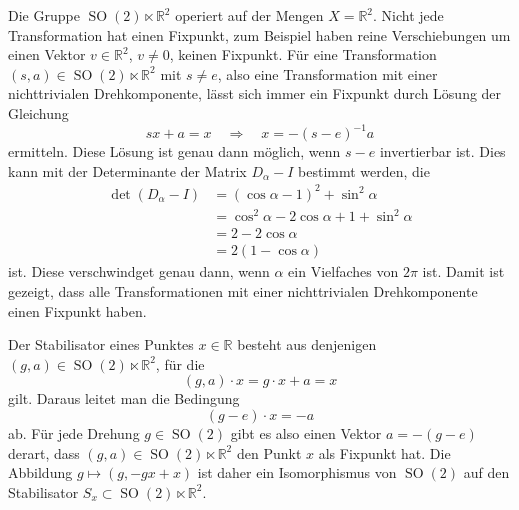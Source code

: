 \begin{beispiel}
Die Gruppe $\operatorname{SO}(2)\ltimes\mathbb{R}^2$ operiert auf der
Mengen $X=\mathbb{R}^2$.
Nicht jede Transformation hat einen Fixpunkt, zum Beispiel haben reine
Verschiebungen um einen Vektor $v\in\mathbb{R}^2$, $v\ne 0$, keinen
Fixpunkt.
Für eine Transformation $(s,a)\in\operatorname{SO}(2)\ltimes \mathbb{R}^2$
mit $s\ne e$, also eine Transformation mit einer nichttrivialen
Drehkomponente, lässt sich immer ein Fixpunkt durch Lösung der 
Gleichung
\[
sx+a=x
\quad\Rightarrow\quad
x = -(s-e)^{-1}a
\]
ermitteln.
Diese Lösung ist genau dann möglich, wenn $s-e$ invertierbar ist.
Dies kann mit der Determinante der Matrix $D_\alpha-I$ bestimmt werden,
die
\begin{align*}
\det(D_\alpha-I)
&=
(\cos\alpha-1)^2+\sin^2\alpha
\\
&=
\cos^2\alpha-2\cos\alpha +1+\sin^2\alpha
\\
&=
2-2\cos\alpha 
\\
&=
2(1-\cos\alpha)
\end{align*}
ist.
Diese verschwindget genau dann, wenn $\alpha$ ein Vielfaches von $2\pi$ ist.
Damit ist gezeigt, dass alle Transformationen mit einer nichttrivialen
Drehkomponente einen Fixpunkt haben.

Der Stabilisator eines Punktes $x\in\mathbb{R}$ besteht aus denjenigen
$(g,a)\in\operatorname{SO}(2)\ltimes \mathbb{R}^2$, für die
\[
(g,a)\cdot x = g\cdot x+a = x
\]
gilt.
Daraus leitet man die Bedingung 
\[
(g-e)\cdot x = -a
\]
ab.
Für jede Drehung $g\in\operatorname{SO}(2)$ gibt es also einen Vektor
$a=-(g-e)$ derart, dass $(g,a)\in\operatorname{SO}(2)\ltimes\mathbb{R}^2$
den Punkt $x$ als Fixpunkt hat.
Die Abbildung $g\mapsto(g,-gx+x)$ ist daher ein Isomorphismus von
$\operatorname{SO}(2)$ auf den Stabilisator
$S_x\subset \operatorname{SO}(2)\ltimes \mathbb{R}^2$.
\end{beispiel}

